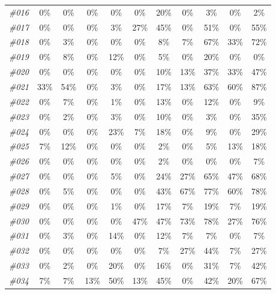 \begin{table}[t]
\begin{tabular}{ccccccccccc}
    \textit{\#016} & 0\%   & 0\%   & 0\%   & 0\%   & 0\%   & 20\%  & 0\%   & 3\%   & 0\%   & 2\% \\
    \textit{\#017} & 0\%   & 0\%   & 0\%   & 3\%   & 27\%  & 45\%  & 0\%   & 51\%  & 0\%   & 55\% \\
    \textit{\#018} & 0\%   & 3\%   & 0\%   & 0\%   & 0\%   & 8\%   & 7\%   & 67\%  & 33\%  & 72\% \\
    \textit{\#019} & 0\%   & 8\%   & 0\%   & 12\%  & 0\%   & 5\%   & 0\%   & 20\%  & 0\%   & 0\% \\
    \textit{\#020} & 0\%   & 0\%   & 0\%   & 0\%   & 0\%   & 10\%  & 13\%  & 37\%  & 33\%  & 47\% \\
    \textit{\#021} & 33\%  & 54\%  & 0\%   & 3\%   & 0\%   & 17\%  & 13\%  & 63\%  & 60\%  & 87\% \\
    \textit{\#022} & 0\%   & 7\%   & 0\%   & 1\%   & 0\%   & 13\%  & 0\%   & 12\%  & 0\%   & 9\% \\
    \textit{\#023} & 0\%   & 2\%   & 0\%   & 3\%   & 0\%   & 10\%  & 0\%   & 3\%   & 0\%   & 35\% \\
    \textit{\#024} & 0\%   & 0\%   & 0\%   & 23\%  & 7\%   & 18\%  & 0\%   & 9\%   & 0\%   & 29\% \\
    \textit{\#025} & 7\%   & 12\%  & 0\%   & 0\%   & 0\%   & 2\%   & 0\%   & 5\%   & 13\%  & 18\% \\
    \textit{\#026} & 0\%   & 0\%   & 0\%   & 0\%   & 0\%   & 2\%   & 0\%   & 0\%   & 0\%   & 7\% \\
    \textit{\#027} & 0\%   & 0\%   & 0\%   & 5\%   & 0\%   & 24\%  & 27\%  & 65\%  & 47\%  & 68\% \\
    \textit{\#028} & 0\%   & 5\%   & 0\%   & 0\%   & 0\%   & 43\%  & 67\%  & 77\%  & 60\%  & 78\% \\
    \textit{\#029} & 0\%   & 0\%   & 0\%   & 1\%   & 0\%   & 17\%  & 7\%   & 19\%  & 7\%   & 19\% \\
    \textit{\#030} & 0\%   & 0\%   & 0\%   & 0\%   & 47\%  & 47\%  & 73\%  & 78\%  & 27\%  & 76\% \\
    \textit{\#031} & 0\%   & 3\%   & 0\%   & 14\%  & 0\%   & 12\%  & 7\%   & 7\%   & 0\%   & 7\% \\
    \textit{\#032} & 0\%   & 0\%   & 0\%   & 0\%   & 0\%   & 7\%   & 27\%  & 44\%  & 7\%   & 27\% \\
    \textit{\#033} & 0\%   & 2\%   & 0\%   & 20\%  & 0\%   & 16\%  & 0\%   & 31\%  & 7\%   & 42\% \\
    \textit{\#034} & 7\%   & 7\%   & 13\%  & 50\%  & 13\%  & 45\%  & 0\%   & 42\%  & 20\%  & 67\% \\

\end{tabular}
\end{table}
